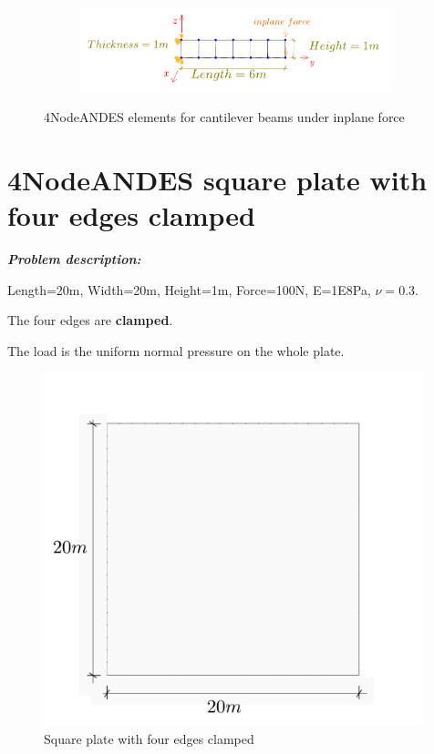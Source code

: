 \documentclass[fleqn,11pt,letter]{article}
\begin{document}
\begin{figure}[H]
  \centering
  \vskip 8pt
  \begin{subfigure}{0.5\textwidth}
    \centering
    \includegraphics[width=9cm]{../Figure_files/4NodeANDES/beam_ANDES_yz_inPlane_6div.pdf}
  \end{subfigure}
  \captionsetup{justification=centering,margin=3cm}
  \caption{4NodeANDES elements for cantilever beams under inplane force}
  \label{fig 4NodeANDES elements for cantilever beams under inplane force}
\end{figure}




















\newpage
\section{4NodeANDES square plate with four edges clamped}



\emph{\textbf{Problem description:}}



Length=20m, Width=20m, Height=1m, Force=100N, E=1E8Pa, $\nu=0.3$. 

The four edges are \textbf{clamped}. 

The load is the uniform normal pressure on the whole plate. 


\begin{figure}[H]
  \centering
  \includegraphics[width=11cm]{../Figure_files/4NodeANDES/square_plate_descrp.pdf}
  \caption{Square plate with four edges clamped }
  \label{fig 4NodeANDES edges clamped square plate with element side length for program description }
\end{figure}
\end{document}
